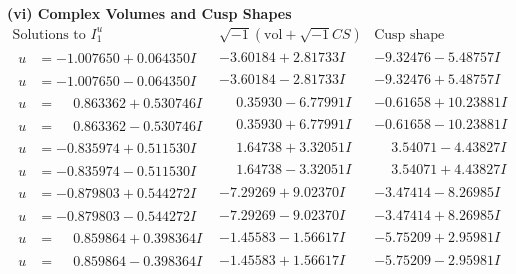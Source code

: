 \documentclass[1p]{elsarticle_modified}
\theoremstyle{definition}
\newcommand{\I}{\sqrt{-1}}
\begin{document}
\newpage\flushleft \textbf{(vi) Complex Volumes and Cusp Shapes}
$$\begin{array}{c|c|c}  
\text{Solutions to }I^u_{1}& \I (\text{vol} + \sqrt{-1}CS) & \text{Cusp shape}\\
 \hline 
\begin{aligned}
u &= -1.007650 + 0.064350 I\end{aligned}
 & -3.60184 + 2.81733 I & -9.32476 - 5.48757 I \\ \hline\begin{aligned}
u &= -1.007650 - 0.064350 I\end{aligned}
 & -3.60184 - 2.81733 I & -9.32476 + 5.48757 I \\ \hline\begin{aligned}
u &= \phantom{-}0.863362 + 0.530746 I\end{aligned}
 & \phantom{-}0.35930 - 6.77991 I & -0.61658 + 10.23881 I \\ \hline\begin{aligned}
u &= \phantom{-}0.863362 - 0.530746 I\end{aligned}
 & \phantom{-}0.35930 + 6.77991 I & -0.61658 - 10.23881 I \\ \hline\begin{aligned}
u &= -0.835974 + 0.511530 I\end{aligned}
 & \phantom{-}1.64738 + 3.32051 I & \phantom{-}3.54071 - 4.43827 I \\ \hline\begin{aligned}
u &= -0.835974 - 0.511530 I\end{aligned}
 & \phantom{-}1.64738 - 3.32051 I & \phantom{-}3.54071 + 4.43827 I \\ \hline\begin{aligned}
u &= -0.879803 + 0.544272 I\end{aligned}
 & -7.29269 + 9.02370 I & -3.47414 - 8.26985 I \\ \hline\begin{aligned}
u &= -0.879803 - 0.544272 I\end{aligned}
 & -7.29269 - 9.02370 I & -3.47414 + 8.26985 I \\ \hline\begin{aligned}
u &= \phantom{-}0.859864 + 0.398364 I\end{aligned}
 & -1.45583 - 1.56617 I & -5.75209 + 2.95981 I \\ \hline\begin{aligned}
u &= \phantom{-}0.859864 - 0.398364 I\end{aligned}
 & -1.45583 + 1.56617 I & -5.75209 - 2.95981 I \\ \hline\begin{aligned}

\end{aligned}
\end{array}$$
\end{document}

